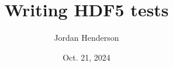 \documentclass[letterpaper,rfc,hyper]{HDF5_RFC}
\title{Writing HDF5 tests}
\author{Jordan Henderson}
\date{Oct. 21, 2024}
\begin{document}
\maketitle



\newpage
\tableofcontents

\newpage










\makerevisions




\appendix




\end{document}
